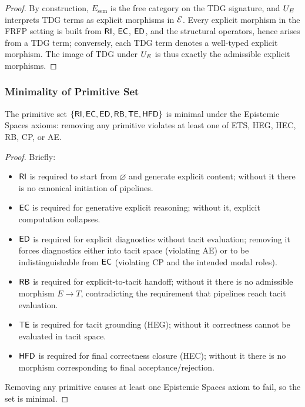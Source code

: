\begin{proof}
By construction, \(E_{\mathrm{sem}}\) is the free category on the TDG
signature, and \(U_E\) interprets TDG terms as explicit morphisms in
\(\mathcal{E}\). Every explicit morphism in the FRFP setting is built from
\(\mathsf{RI}\), \(\mathsf{EC}\), \(\mathsf{ED}\), and the structural operators, hence arises from
a TDG term; conversely, each TDG term denotes a well-typed explicit
morphism. The image of TDG under \(U_E\) is thus exactly the admissible
explicit morphisms.
\end{proof}

\subsubsection{Minimality of Primitive Set}

\begin{theorem}[Minimality]
\label{thm:minimality}
The primitive set
\(\{\mathsf{RI},\mathsf{EC},\mathsf{ED},\mathsf{RB},\mathsf{TE},\mathsf{HFD}\}\)
is minimal under the Epistemic Spaces axioms: removing any primitive violates at
least one of ETS, HEG, HEC, RB, CP, or AE.
\end{theorem}

\begin{proof}
Briefly:
\begin{itemize}
  \item \(\mathsf{RI}\) is required to start from \(\varnothing\) and generate explicit
        content; without it there is no canonical initiation of pipelines.
  \item \(\mathsf{EC}\) is required for generative explicit reasoning; without it,
        explicit computation collapses.
  \item \(\mathsf{ED}\) is required for explicit diagnostics without tacit evaluation;
        removing it forces diagnostics either into tacit space (violating AE)
        or to be indistinguishable from \(\mathsf{EC}\) (violating CP and the intended
        modal roles).
  \item \(\mathsf{RB}\) is required for explicit-to-tacit handoff; without it there is
        no admissible morphism \(E \to T\), contradicting the requirement that
        pipelines reach tacit evaluation.
  \item \(\mathsf{TE}\) is required for tacit grounding (HEG); without it correctness
        cannot be evaluated in tacit space.
  \item \(\mathsf{HFD}\) is required for final correctness closure (HEC); without it
        there is no morphism corresponding to final acceptance/rejection.
\end{itemize}
Removing any primitive causes at least one Epistemic Spaces axiom to fail, so the
set is minimal.
\end{proof}

